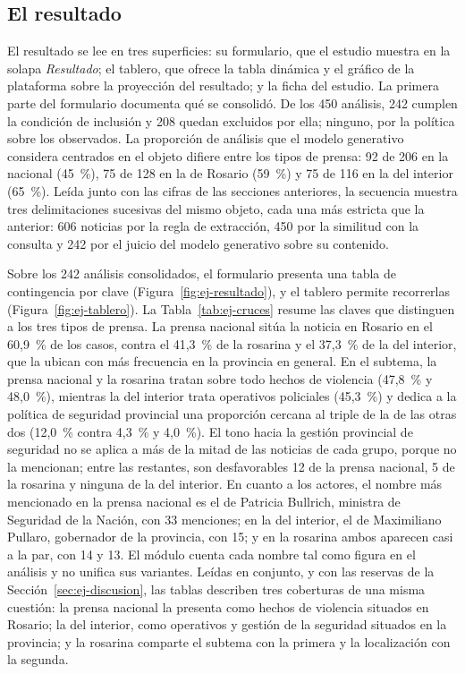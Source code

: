 \documentclass[12pt]{report}
\begin{document}
\subsection{El resultado}
\label{sec:ej-res-resultado}

El resultado se lee en tres superficies: su formulario, que el estudio muestra en la solapa \textit{Resultado}; el tablero, que ofrece la tabla dinámica y el gráfico de la plataforma sobre la proyección del resultado; y la ficha del estudio. La primera parte del formulario documenta qué se consolidó. De los 450 análisis, 242 cumplen la condición de inclusión y 208 quedan excluidos por ella; ninguno, por la política sobre los observados. La proporción de análisis que el modelo generativo considera centrados en el objeto difiere entre los tipos de prensa: 92 de 206 en la nacional (45~\%), 75 de 128 en la de Rosario (59~\%) y 75 de 116 en la del interior (65~\%). Leída junto con las cifras de las secciones anteriores, la secuencia muestra tres delimitaciones sucesivas del mismo objeto, cada una más estricta que la anterior: 606 noticias por la regla de extracción, 450 por la similitud con la consulta y 242 por el juicio del modelo generativo sobre su contenido.

Sobre los 242 análisis consolidados, el formulario presenta una tabla de contingencia por clave (Figura~\ref{fig:ej-resultado}), y el tablero permite recorrerlas (Figura~\ref{fig:ej-tablero}). La Tabla~\ref{tab:ej-cruces} resume las claves que distinguen a los tres tipos de prensa. La prensa nacional sitúa la noticia en Rosario en el 60,9~\% de los casos, contra el 41,3~\% de la rosarina y el 37,3~\% de la del interior, que la ubican con más frecuencia en la provincia en general. En el subtema, la prensa nacional y la rosarina tratan sobre todo hechos de violencia (47,8~\% y 48,0~\%), mientras la del interior trata operativos policiales (45,3~\%) y dedica a la política de seguridad provincial una proporción cercana al triple de la de las otras dos (12,0~\% contra 4,3~\% y 4,0~\%). El tono hacia la gestión provincial de seguridad no se aplica a más de la mitad de las noticias de cada grupo, porque no la mencionan; entre las restantes, son desfavorables 12 de la prensa nacional, 5 de la rosarina y ninguna de la del interior. En cuanto a los actores, el nombre más mencionado en la prensa nacional es el de Patricia Bullrich, ministra de Seguridad de la Nación, con 33 menciones; en la del interior, el de Maximiliano Pullaro, gobernador de la provincia, con 15; y en la rosarina ambos aparecen casi a la par, con 14 y 13. El módulo cuenta cada nombre tal como figura en el análisis y no unifica sus variantes. Leídas en conjunto, y con las reservas de la Sección~\ref{sec:ej-discusion}, las tablas describen tres coberturas de una misma cuestión: la prensa nacional la presenta como hechos de violencia situados en Rosario; la del interior, como operativos y gestión de la seguridad situados en la provincia; y la rosarina comparte el subtema con la primera y la localización con la segunda.
\end{document}
